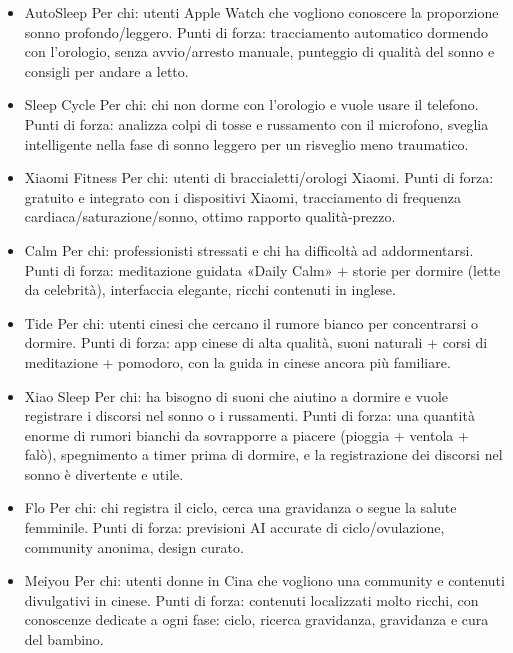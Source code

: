 
\begin{itemize}
  \item AutoSleep Per chi: utenti Apple Watch che vogliono conoscere la proporzione sonno profondo/leggero. Punti di forza: tracciamento automatico dormendo con l'orologio, senza avvio/arresto manuale, punteggio di qualità del sonno e consigli per andare a letto.
  \item Sleep Cycle Per chi: chi non dorme con l'orologio e vuole usare il telefono. Punti di forza: analizza colpi di tosse e russamento con il microfono, sveglia intelligente nella fase di sonno leggero per un risveglio meno traumatico.
  \item Xiaomi Fitness Per chi: utenti di braccialetti/orologi Xiaomi. Punti di forza: gratuito e integrato con i dispositivi Xiaomi, tracciamento di frequenza cardiaca/saturazione/sonno, ottimo rapporto qualità-prezzo.
\end{itemize}


\begin{itemize}
  \item Calm Per chi: professionisti stressati e chi ha difficoltà ad addormentarsi. Punti di forza: meditazione guidata «Daily Calm» + storie per dormire (lette da celebrità), interfaccia elegante, ricchi contenuti in inglese.
  \item Tide Per chi: utenti cinesi che cercano il rumore bianco per concentrarsi o dormire. Punti di forza: app cinese di alta qualità, suoni naturali + corsi di meditazione + pomodoro, con la guida in cinese ancora più familiare.
  \item Xiao Sleep Per chi: ha bisogno di suoni che aiutino a dormire e vuole registrare i discorsi nel sonno o i russamenti. Punti di forza: una quantità enorme di rumori bianchi da sovrapporre a piacere (pioggia + ventola + falò), spegnimento a timer prima di dormire, e la registrazione dei discorsi nel sonno è divertente e utile.
\end{itemize}


\begin{itemize}
  \item Flo Per chi: chi registra il ciclo, cerca una gravidanza o segue la salute femminile. Punti di forza: previsioni AI accurate di ciclo/ovulazione, community anonima, design curato.
  \item Meiyou Per chi: utenti donne in Cina che vogliono una community e contenuti divulgativi in cinese. Punti di forza: contenuti localizzati molto ricchi, con conoscenze dedicate a ogni fase: ciclo, ricerca gravidanza, gravidanza e cura del bambino.
\end{itemize}

